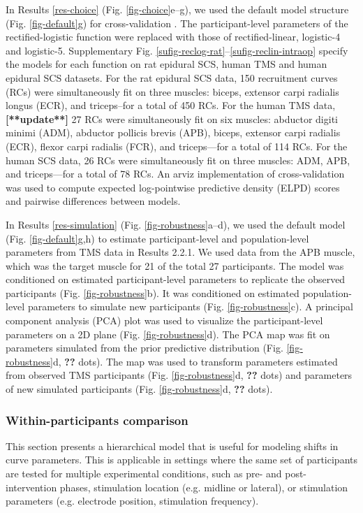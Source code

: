 \documentclass[pdflatex,sn-mathphys-ay]{sn-jnl}%
\numberwithin{equation}{subsection}
\theoremstyle{thmstyleone}%
\theoremstyle{thmstyletwo}%
\theoremstyle{thmstylethree}%
\begin{document}
\bigskip\noindent In Results \ref{res-choice} (Fig. \ref{fig-choice}e--g), we used the default model structure (Fig. \ref{fig-default}g) for cross-validation \cite{vehtari_practical_2017}. The participant-level parameters of the rectified-logistic function were replaced with those of rectified-linear, logistic-4 and logistic-5. Supplementary Fig. \ref{sufig-reclog-rat}--\ref{sufig-reclin-intraop} specify the models for each function on rat epidural SCS, human TMS and human epidural SCS datasets. For the rat epidural SCS data, 150 recruitment curves (RCs) were simultaneously fit on three muscles: biceps, extensor carpi radialis longus (ECR), and triceps--for a total of 450 RCs. For the human TMS data, \textbf{[**update**]} 27 RCs  were simultaneously fit on six muscles: abductor digiti minimi (ADM), abductor pollicis brevis (APB), biceps, extensor carpi radialis (ECR), flexor carpi radialis (FCR), and triceps—for a total of 114 RCs. For the human SCS data, 26 RCs were simultaneously fit on three muscles: ADM, APB, and triceps—for a total of 78 RCs. An arviz \cite{kumar_arviz_2019} implementation of cross-validation \cite{vehtari_practical_2017} was used to compute expected log-pointwise predictive density (ELPD) scores and pairwise differences between models.

\bigskip\noindent In Results \ref{res-simulation} (Fig. \ref{fig-robustness}a--d), we used the default model (Fig. \ref{fig-default}g,h) to estimate participant-level and population-level parameters from TMS data in Results 2.2.1. We used data from the APB muscle, which was the target muscle for 21 of the total 27 participants. The model was conditioned on estimated participant-level parameters to replicate the observed participants (Fig. \ref{fig-robustness}b). It was conditioned on estimated population-level parameters to simulate new participants (Fig. \ref{fig-robustness}c). A principal component analysis (PCA) plot was used to visualize the participant-level parameters on a 2D plane (Fig. \ref{fig-robustness}d). The PCA map was fit on parameters simulated from the prior predictive distribution (Fig. \ref{fig-robustness}d, \textbf{??} dots). The map was used to transform parameters estimated from observed TMS participants (Fig. \ref{fig-robustness}d, \textbf{??} dots) and parameters of new simulated participants (Fig. \ref{fig-robustness}d, \textbf{??} dots).

\subsubsection{Within-participants comparison}
This section presents a hierarchical model that is useful for modeling shifts in curve parameters. This is applicable in settings where the same set of participants are tested for multiple experimental conditions, such as pre- and post-intervention phases, stimulation location (e.g. midline or lateral), or stimulation parameters (e.g. electrode position, stimulation frequency).
\end{document}
